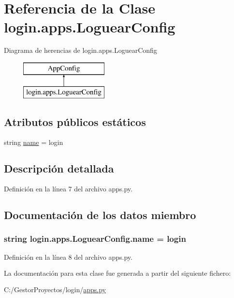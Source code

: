 \hypertarget{classlogin_1_1apps_1_1_loguear_config}{}\section{Referencia de la Clase login.\+apps.\+Loguear\+Config}
\label{classlogin_1_1apps_1_1_loguear_config}
Diagrama de herencias de login.\+apps.\+Loguear\+Config\begin{figure}[H]
\begin{center}
\leavevmode
\includegraphics[height=2.000000cm]{classlogin_1_1apps_1_1_loguear_config}
\end{center}
\end{figure}
\subsection*{Atributos públicos estáticos}
\begin{DoxyCompactItemize}
\item 
string \hyperlink{classlogin_1_1apps_1_1_loguear_config_af328d85da2752aff302e45fec6cc4931}{name} = \textquotesingle{}login\textquotesingle{}
\end{DoxyCompactItemize}


\subsection{Descripción detallada}


Definición en la línea 7 del archivo apps.\+py.



\subsection{Documentación de los datos miembro}
\subsubsection[{\texorpdfstring{name}{name}}]{\setlength{\rightskip}{0pt plus 5cm}string login.\+apps.\+Loguear\+Config.\+name = \textquotesingle{}login\textquotesingle{}\hspace{0.3cm}{\ttfamily [static]}}\hypertarget{classlogin_1_1apps_1_1_loguear_config_af328d85da2752aff302e45fec6cc4931}{}\label{classlogin_1_1apps_1_1_loguear_config_af328d85da2752aff302e45fec6cc4931}


Definición en la línea 8 del archivo apps.\+py.



La documentación para esta clase fue generada a partir del siguiente fichero\+:\begin{DoxyCompactItemize}
\item 
C\+:/\+Gestor\+Proyectos/login/\hyperlink{login_2apps_8py}{apps.\+py}\end{DoxyCompactItemize}
